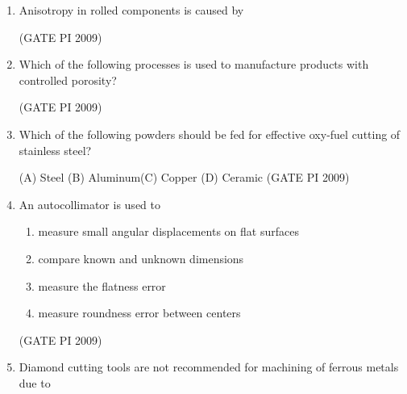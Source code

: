 \documentclass[journal,12pt,onecolumn]{IEEEtran}
\theoremstyle{remark}
\begin{document}
\begin{enumerate}[label=Q.\arabic*]
(A) 14400 \hfill(B) 28800\hfill  (C) 57600 \hfill (D) 72000 \\
 
\hfill (GATE PI 2009)
\item Anisotropy in rolled components is caused by
\begin{enumerate}[label=(\Alph*)]
\end{enumerate}
\hfill (GATE PI 2009)
\item Which of the following processes is used to manufacture products with controlled porosity?
\begin{enumerate}[label=(\Alph*)]
\end{enumerate}
\hfill (GATE PI 2009)
\item Which of the following powders should be fed for effective oxy-fuel cutting of stainless steel?

(A) Steel \hfill (B) Aluminum\hfill (C) Copper \hfill (D) Ceramic 
\hfill (GATE PI 2009)
\item An autocollimator is used to

\begin{enumerate}[label=(\Alph*)]
\item measure small angular displacements on flat surfaces
\item compare known and unknown dimensions
\item measure the flatness error
\item measure roundness error between centers
\end{enumerate}
\hfill (GATE PI 2009)
\item Diamond cutting tools are not recommended for machining of ferrous metals due to


\end{enumerate}
\end{document}
